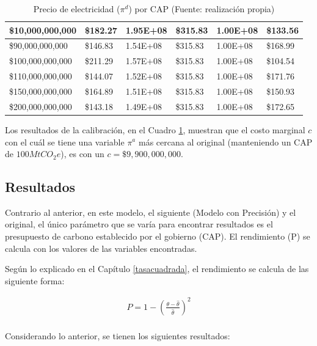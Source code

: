\begin{table}[H]
\begin{tabular}{|l|l|l|l|l|l|}
         \$10,000,000,000  &  \$182.27  & 1.95E+08 &  \$315.83  & 1.00E+08 &  \$133.56   \\ \hline
         \$90,000,000,000  &  \$146.83  & 1.54E+08 &  \$315.83  & 1.00E+08 &  \$168.99   \\ \hline
         \$100,000,000,000  &  \$211.29  & 1.57E+08 &  \$315.83  & 1.00E+08 &  \$104.54   \\ \hline
         \$110,000,000,000  &  \$144.07  & 1.52E+08 &  \$315.83  & 1.00E+08 &  \$171.76   \\ \hline
         \$150,000,000,000  &  \$164.89  & 1.51E+08 &  \$315.83  & 1.00E+08 &  \$150.93   \\ \hline
         \$200,000,000,000  &  \$143.18  & 1.49E+08 &  \$315.83  & 1.00E+08 &  \$172.65   \\ \hline
    \end{tabular}
    \caption{{\footnotesize Precio de electricidad ($\pi^d$) por CAP (Fuente: realización propia)}}
    \label{calibracioncuadrado}
\end{table}

Los resultados de la calibración, en el Cuadro \ref{calibracioncuadrado}, muestran que el costo marginal $c$ con el cuál se tiene una variable $\pi^a$ más cercana al original (manteniendo un CAP de $100MtCO_{2}e$), es con un $c=\$9,900,000,000$.

\subsection{Resultados}

Contrario al anterior, en este modelo, el siguiente (Modelo con Precisión) y el original, el único parámetro que se varía para encontrar resultados es el presupuesto de carbono establecido por el gobierno (CAP). El rendimiento (P) se calcula con los valores de las variables encontradas.
\vspace{2.5mm}

Según lo explicado en el Capítulo \ref{tasacuadrada}, el rendimiento se calcula de las siguiente forma: 
\vspace{2.5mm}

\begin{equation}
\begin{array}{rrclcl}
\displaystyle P = 1- (\frac{{\theta - \hat{\theta}}}{\hat{\theta}})^2 \\
\end{array}
\end{equation}

Considerando lo anterior, se tienen los siguientes resultados:

